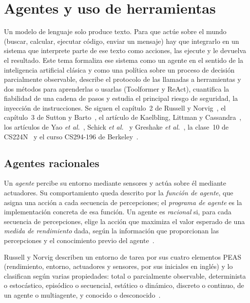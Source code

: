 \chapter{Agentes y uso de herramientas}
\label{tema:6}

Un modelo de lenguaje solo produce texto. Para que actúe sobre el mundo (buscar, calcular, ejecutar código, enviar un mensaje) hay que integrarlo en un sistema que interprete parte de ese texto como acciones, las ejecute y le devuelva el resultado. Este tema formaliza ese sistema como un agente en el sentido de la inteligencia artificial clásica y como una política sobre un proceso de decisión parcialmente observable, describe el protocolo de las llamadas a herramientas y dos métodos para aprenderlas o usarlas (Toolformer y ReAct), cuantifica la fiabilidad de una cadena de pasos y estudia el principal riesgo de seguridad, la inyección de instrucciones. Se siguen el capítulo~2 de Russell y Norvig~\cite{aima}, el capítulo~3 de Sutton y Barto~\cite{sb}, el artículo de Kaelbling, Littman y Cassandra~\cite{kaelbling}, los artículos de Yao \emph{et al.}~\cite{react}, Schick \emph{et al.}~\cite{toolformer} y Greshake \emph{et al.}~\cite{greshake}, la clase~10 de CS224N~\cite{cs224n} y el curso CS294-196 de Berkeley~\cite{cs294}.

\section{Agentes racionales}

\begin{definicion}[Agente]\label{def:agente}
Un \emph{agente} percibe su entorno mediante sensores y actúa sobre él mediante actuadores. Su comportamiento queda descrito por la \emph{función de agente}, que asigna una acción a cada secuencia de percepciones; el \emph{programa de agente} es la implementación concreta de esa función. Un agente es \emph{racional} si, para cada secuencia de percepciones, elige la acción que maximiza el valor esperado de una \emph{medida de rendimiento} dada, según la información que proporcionan las percepciones y el conocimiento previo del agente~\cite[cap.~2]{aima}.
\end{definicion}

Russell y Norvig describen un entorno de tarea por sus cuatro elementos PEAS (rendimiento, entorno, actuadores y sensores, por sus iniciales en inglés) y lo clasifican según varias propiedades: total o parcialmente observable, determinista o estocástico, episódico o secuencial, estático o dinámico, discreto o continuo, de un agente o multiagente, y conocido o desconocido~\cite[cap.~2]{aima}.

